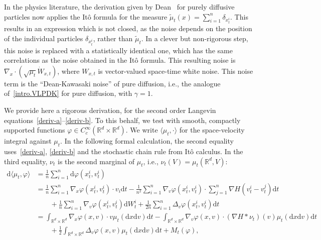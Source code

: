 \documentclass{article}
\newcommand{\dd}{\text{d}}
\newcommand{\R}{\mathbb{R}}
\begin{document}
In the physics literature, the derivation given by Dean~\cite{Dean1996a} for purely diffusive particles now
applies the It\^o formula for the measure $\tilde \mu_t(x) = \sum_{i=1}^n \delta_{x_t^i}$. This results in an
expression which is not closed, as the noise depends on the position of the individual particles
$\delta_{x_t^i}$, rather than $\tilde \mu_t$. In a clever but non-rigorous step, this noise is replaced with a
statistically identical one, which has the same correlations as the noise obtained in the It\^o formula. This
resulting noise is $\nabla_x \cdot (\sqrt{\mu_t} \dot W_{x,t})$, where $W_{x,t}$ is vector-valued space-time
white noise. This noise term is the ``Dean-Kawasaki noise'' of pure diffusion, i.e., the analogue
of~\eqref{intro.VLPDK} for pure diffusion, with $\gamma=1$.


We provide here a rigorous derivation, for the second order Langevin
equations~\eqref{deriv-a}--\eqref{deriv-b}. To this behalf, we test with smooth, compactly supported functions
$\varphi \in C^\infty_c(\R^d \times \R^d)$. We write $\langle \mu_t, \cdot \rangle$ for the space-velocity
integral against $\mu_t$. In the following formal calculation, the second equality uses~\eqref{deriv-a},
\eqref{deriv-b} and the stochastic chain rule from It\^o calculus. In the third equality, $\nu_t$ is the
second marginal of $\mu_t$, i.e., $\nu_t(V) = \mu_t(\R^d,V)$:
\begin{align*}
  \dd \langle \mu_t, \varphi \rangle &= \frac 1 n \sum_{i=1}^n \dd 
                                \varphi(x_t^i, v_t^i) \\
                              &= \frac 1 n \sum_{i=1}^n \nabla_x\varphi(x_t^i, v_t^i) \cdot v_i \dd t 
                                - \frac 1 {n^2} \sum_{i=1}^n \nabla_v\varphi(x_t^i, v_t^i)\cdot\sum_{j=1}^n \nabla H(v_t^i - v_t^j) \dd t \\
                              & \qquad{}
                                + \frac 1 n \sum_{i=1}^n \nabla_v\varphi(x_t^i, v_t^i) \dd W_t^i
                                + \frac 1 {2n} \sum_{i=1}^n \Delta_{v}\varphi(x_t^i, v_t^i) \dd t \\ 
                              &= \int_{\R^d \times \R^d} \nabla_x\varphi(x, v) \cdot v  \mu_t(\dd x \dd v) \dd t -  \int_{\R^d \times \R^d} \nabla_v\varphi(x, v) \cdot (\nabla H \ast \nu_t)(v) \mu_t(\dd x \dd v) \dd t \\
                              &\qquad{}+\frac 1 2 \int_{\R^d \times \R^d}
                                \Delta_{v}\varphi(x, v) \mu_t(\dd x \dd v) \dd t  + M_t(\varphi),
\end{align*}
\end{document}
